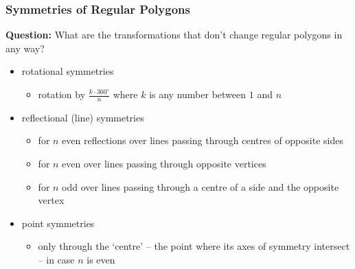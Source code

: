\documentclass[aspectratio=169,11pt,svgnames]{beamer}
\begin{document}
\begin{frame}
 \frametitle{Symmetries of Regular Polygons}
 \textbf{Question:} What are the transformations that don't change regular
 polygons in any way?
 \pause
 \begin{itemize}[label=\textbullet]
  \item<1-> rotational symmetries
  \begin{itemize}[label=$\circ$]
   \item<2-> rotation by $\frac{k \cdot 360^{ \circ }}{n}$ where $k$ is any
    number between $1$ and $n$
  \end{itemize}
 \item<3-> reflectional (line) symmetries
  \begin{itemize}[label=$\circ$]
   \item<4-> for $n$ even reflections over lines passing through centres of opposite
    sides
   \item<4-> for $n$ even over lines passing through opposite vertices
   \item<4-> for $n$ odd over lines passing through a centre of a side and the
    opposite vertex
  \end{itemize}
 \item<5-> point symmetries
 \begin{itemize}[label=$\circ$]
  \item<6-> only through the `centre' -- the point where its axes of symmetry
   intersect -- in case $n$ is even
 \end{itemize}
 \end{itemize}
\end{frame}
\end{document}
